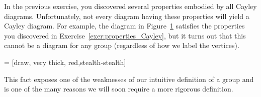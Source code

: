 In the previous exercise, you discovered several properties embodied by all Cayley diagrams. Unfortunately, not every diagram having these properties will yield a Cayley diagram.  For example, the diagram in Figure~\ref{fig:nonRegular} satisfies the properties you discovered in Exercise~\ref{exer:properties_Cayley}, but it turns out that this cannot be a diagram for any group (regardless of how we label the vertices).

 = [draw, very thick, red,stealth-stealth]

\begin{figure}[!ht]
\centering
{}
\caption{}
\label{fig:nonRegular}
\end{figure}

This fact exposes one of the weaknesses of our intuitive definition of a group and is one of the many reasons we will soon require a more rigorous definition.
